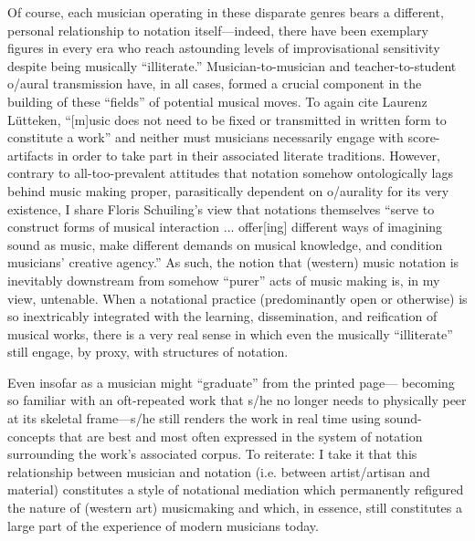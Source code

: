     Of course, each musician operating in these disparate genres bears a different, personal relationship to notation itself---indeed, there have been exemplary figures in every era who reach astounding levels of improvisational sensitivity despite being musically ``illiterate.'' Musician-to-musician and teacher-to-student o/aural transmission have, in all cases, formed a crucial component in the building of these ``fields'' of potential musical moves. To again cite Laurenz L\"utteken, ``[m]usic does not need to be fixed or transmitted in written form to constitute a work'' and neither must musicians necessarily engage with score-artifacts in order to take part in their associated literate traditions.\autocite{Lutteken_2020} However, contrary to all-too-prevalent attitudes that notation somehow ontologically lags behind music making proper, parasitically dependent on o/aurality for its very existence, I share Floris Schuiling's view that notations themselves ``serve to construct forms of musical interaction ... offer[ing] different ways of imagining sound as music, make different demands on musical knowledge, and condition musicians' creative agency.''\autocite[431]{Schuiling_2019} As such, the notion that (western) music notation is inevitably downstream from somehow ``purer'' acts of music making is, in my view, untenable. When a notational practice (predominantly open or otherwise) is so inextricably integrated with the learning, dissemination, and reification of musical works, there is a very real sense in which even the musically ``illiterate'' still engage, by proxy, with structures of notation. 

    Even insofar as a musician might ``graduate'' from the printed page--- becoming so familiar with an oft-repeated work that s/he no longer needs to physically peer at its skeletal frame---s/he still renders the work in real time using sound-concepts that are best and most often expressed in the system of notation surrounding the work's associated corpus. To reiterate: I take it that this relationship between musician and notation (i.e. between artist/artisan and material) constitutes a style of notational mediation which permanently refigured the nature of (western art) musicmaking and which, in essence, still constitutes a large part of the experience of modern musicians today. 
    

